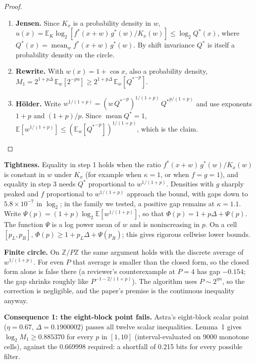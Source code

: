 \documentclass[11pt]{article}
\DeclareMathOperator{\mean}{mean}
\newcommand{\E}{\mathbb{E}}
\theoremstyle{plain}
\begin{document}
\begin{proof}
\leavevmode
\begin{enumerate}
\item \textbf{Jensen.} Since $K_x$ is a probability density in $w$, $u(x) = \E_K \log_2[f^*(x+w)\, g^*(w) / K_x(w)] \le \log_2 Q^*(x)$, where $Q^*(x) = \mean_w f^*(x+w)\, g^*(w)$. By shift invariance $Q^*$ is itself a probability density on the circle.
\item \textbf{Rewrite.} With $w(x) = 1 + \cos x$, also a probability density, $M_1 = 2^{1+p \Delta}\, \E_w[2^{-p u}] \ge 2^{1+p \Delta}\, \E_w[{Q^*}^{-p}]$.
\item \textbf{H\"older.} Write $w^{1/(1+p)} = (w\, {Q^*}^{-p})^{1/(1+p)}\, {Q^*}^{p/(1+p)}$ and use exponents $1+p$ and $(1+p)/p$. Since $\mean Q^* = 1$, $\E[w^{1/(1+p)}] \le (\E_w[{Q^*}^{-p}])^{1/(1+p)}$, which is the claim. \qedhere
\end{enumerate}
\end{proof}

\textbf{Tightness.} Equality in step 1 holds when the ratio $f^*(x+w)\,g^*(w)/K_x(w)$ is constant in $w$ under $K_x$ (for example when $\kappa = 1$, or when $f = g = 1$), and equality in step 3 needs $Q^*$ proportional to $w^{1/(1+p)}$. Densities with $g$ sharply peaked and $f$ proportional to $w^{1/(1+p)}$ approach the bound, with gaps down to $5.8\times10^{-7}$ in $\log_2$; in the family we tested, a positive gap remains at $\kappa = 1.1$. Write $\Psi(p) = (1+p) \log_2 \E[w^{1/(1+p)}]$, so that $\Phi(p) = 1 + p\Delta + \Psi(p)$. The function $\Psi$ is a log power mean of $w$ and is nonincreasing in $p$. On a cell $[p_L,p_R]$, $\Phi(p)\ge 1+p_L\Delta+\Psi(p_R)$; this gives rigorous cellwise lower bounds.

\textbf{Finite circle.} On $\mathbb{Z}/P\mathbb{Z}$ the same argument holds with the discrete average of $w^{1/(1+p)}$. For even $P$ that average is smaller than the closed form, so the closed form alone is false there (a reviewer's counterexample at $P = 4$ has gap $-0.154$; the gap shrinks roughly like $P^{-1-2/(1+p)}$). The algorithm uses $P \sim 2^{\eta n}$, so the correction is negligible, and the paper's premise is the continuous inequality anyway.

\textbf{Consequence 1: the eight-block point fails.} Astra's eight-block scalar point ($\eta = 0.67$, $\Delta = 0.1900002$) passes all twelve scalar inequalities. Lemma~1 gives $\log_2 M_1 \ge 0.885370$ for every $p$ in $[1, 10]$ (interval-evaluated on 9000 monotone cells), against the 0.669998 required: a shortfall of 0.215 bits for every possible filter.
\end{document}
